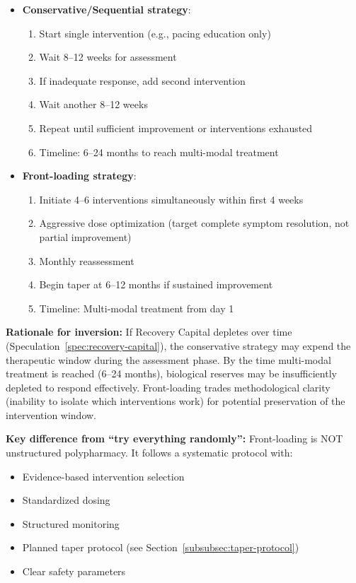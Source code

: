 \begin{itemize}
    \item \textbf{Conservative/Sequential strategy}:
    \begin{enumerate}
        \item Start single intervention (e.g., pacing education only)
        \item Wait 8--12 weeks for assessment
        \item If inadequate response, add second intervention
        \item Wait another 8--12 weeks
        \item Repeat until sufficient improvement or interventions exhausted
        \item Timeline: 6--24 months to reach multi-modal treatment
    \end{enumerate}

    \item \textbf{Front-loading strategy}:
    \begin{enumerate}
        \item Initiate 4--6 interventions simultaneously within first 4 weeks
        \item Aggressive dose optimization (target complete symptom resolution, not partial improvement)
        \item Monthly reassessment
        \item Begin taper at 6--12 months if sustained improvement
        \item Timeline: Multi-modal treatment from day 1
    \end{enumerate}
\end{itemize}

\textbf{Rationale for inversion:} If Recovery Capital depletes over time (Speculation~\ref{spec:recovery-capital}), the conservative strategy may expend the therapeutic window during the assessment phase. By the time multi-modal treatment is reached (6--24 months), biological reserves may be insufficiently depleted to respond effectively. Front-loading trades methodological clarity (inability to isolate which interventions work) for potential preservation of the intervention window.

\textbf{Key difference from ``try everything randomly'':} Front-loading is NOT unstructured polypharmacy. It follows a systematic protocol with:
\begin{itemize}
    \item Evidence-based intervention selection
    \item Standardized dosing
    \item Structured monitoring
    \item Planned taper protocol (see Section~\ref{subsubsec:taper-protocol})
    \item Clear safety parameters
\end{itemize}

